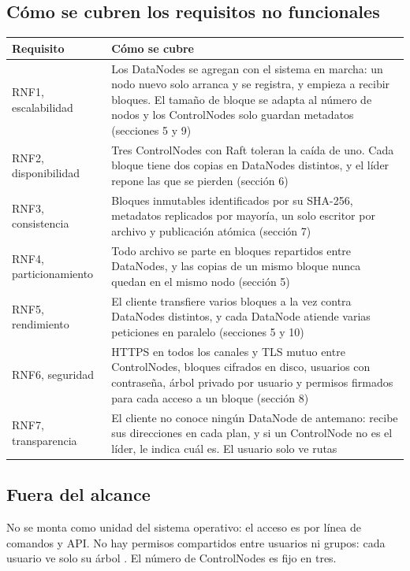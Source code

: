 \documentclass[10pt]{article}
\begin{document}
\subsection{Cómo se cubren los requisitos no funcionales}

\begin{xltabular}{\linewidth}{@{}L{3.2cm}Y@{}}
\toprule
Requisito & Cómo se cubre \\
\midrule\endhead
RNF1, escalabilidad & Los DataNodes se agregan con el sistema en marcha: un nodo nuevo solo arranca y se registra, y empieza a recibir bloques. El tamaño de bloque se adapta al número de nodos y los ControlNodes solo guardan metadatos (secciones 5 y 9) \\
RNF2, disponibilidad & Tres ControlNodes con Raft toleran la caída de uno. Cada bloque tiene dos copias en DataNodes distintos, y el líder repone las que se pierden (sección 6) \\
RNF3, consistencia & Bloques inmutables identificados por su SHA-256, metadatos replicados por mayoría, un solo escritor por archivo y publicación atómica (sección 7) \\
RNF4, particionamiento & Todo archivo se parte en bloques repartidos entre DataNodes, y las copias de un mismo bloque nunca quedan en el mismo nodo (sección 5) \\
RNF5, rendimiento & El cliente transfiere varios bloques a la vez contra DataNodes distintos, y cada DataNode atiende varias peticiones en paralelo (secciones 5 y 10) \\
RNF6, seguridad & HTTPS en todos los canales y TLS mutuo entre ControlNodes, bloques cifrados en disco, usuarios con contraseña, árbol privado por usuario y permisos firmados para cada acceso a un bloque (sección 8) \\
RNF7, transparencia & El cliente no conoce ningún DataNode de antemano: recibe sus direcciones en cada plan, y si un ControlNode no es el líder, le indica cuál es. El usuario solo ve rutas \\
\bottomrule
\end{xltabular}

\subsection{Fuera del alcance}

No se monta como unidad del sistema operativo: el acceso es por línea de comandos y API. No hay permisos compartidos entre usuarios ni grupos: cada usuario ve solo su árbol . El número de ControlNodes es fijo en tres.
\end{document}
